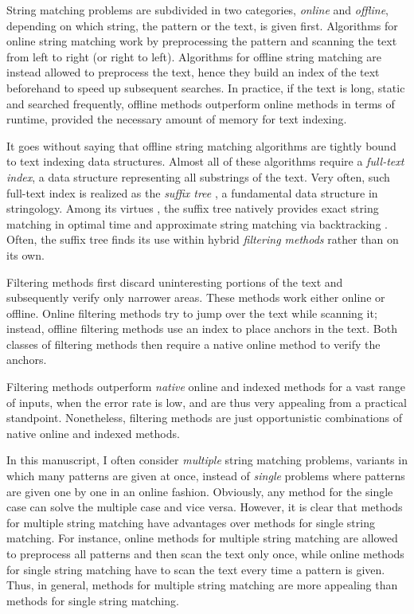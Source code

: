 String matching problems are subdivided in two categories, \emph{online} and \emph{offline}, depending on which string, the pattern or the text, is given first.
Algorithms for online string matching work by preprocessing the pattern and scanning the text from left to right (or right to left).
Algorithms for offline string matching are instead allowed to preprocess the text,
hence they build an index of the text beforehand to speed up subsequent searches.
In practice, if the text is long, static and searched frequently, offline methods outperform online methods in terms of runtime, provided the necessary amount of memory for text indexing.

It goes without saying that offline string matching algorithms are tightly bound to text indexing data structures.
Almost all of these algorithms require a \emph{full-text index}, \ie a data structure representing all substrings of the text.
Very often, such full-text index is realized as the \emph{suffix tree} \citep{Weiner1973}, a fundamental data structure in stringology.
Among its virtues \citep{Apostolico1985}, the suffix tree natively provides exact string matching in optimal time and approximate string matching via backtracking \citep{Ukkonen1993}.
Often, the suffix tree finds its use within hybrid \emph{filtering methods} rather than on its own.

Filtering methods first discard uninteresting portions of the text and subsequently verify only narrower areas.
These methods work either online or offline.
Online filtering methods try to jump over the text while scanning it; instead, offline filtering methods use an index to place anchors in the text.
Both classes of filtering methods then require a native online method to verify the anchors.

Filtering methods outperform \emph{native} online and indexed methods for a vast range of inputs, \ie when the error rate is low, and are thus very appealing from a practical standpoint.
Nonetheless, filtering methods are just opportunistic combinations of native online and indexed methods.

In this manuscript, I often consider \emph{multiple} string matching problems, \ie variants in which many patterns are given at once, instead of \emph{single} problems where patterns are given one by one in an online fashion.
Obviously, any method for the single case can solve the multiple case and vice versa.
However, it is clear that methods for multiple string matching have advantages over methods for single string matching.
For instance, online methods for multiple string matching are allowed to preprocess all patterns and then scan the text only once, while online methods for single string matching have to scan the text every time a pattern is given.
Thus, in general, methods for multiple string matching are more appealing than methods for single string matching.

